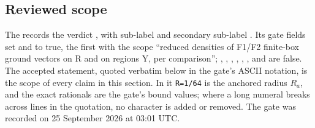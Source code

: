 \subsection{Reviewed scope}
\label{sec:bb1-scope}
\enlargethispage{\baselineskip}%
The  records the
verdict , with sub-label
 and secondary sub-label
. Its gate fields set
 and  to true, the first
with the scope ``reduced densities of F1/F2 finite-box ground vectors on R and
on regions Y, per comparison''; ,
, ,
, ,
,  and
 are false. The accepted statement,
quoted verbatim below in the gate's ASCII notation, is the scope of every
claim in this section. In it \texttt{R=1/64} is the anchored radius $R_a$, and
the exact rationals are the gate's bound values; where a long numeral breaks
across lines in the quotation, no character is added or removed. The gate was
recorded on 25 September 2026 at 03:01 UTC.
